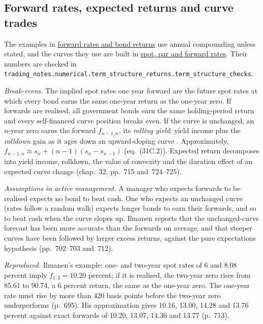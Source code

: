 \subsection{Forward rates, expected returns and curve trades}

The examples in \hyperref[meth:forward-rates-expected-returns]{forward rates and bond returns} use annual compounding unless stated, and the curves they use are built in \hyperref[meth:spot-par-forward-curves]{spot, par and forward rates}. Their numbers are checked in \nolinkurl{trading_notes.numerical.term_structure_returns.term_structure_checks}.

\begin{qfmethod}\label{meth:forward-rates-expected-returns}
 \emph{Break-evens.} The implied spot rates one year forward are the future spot rates at which every bond earns the same one-year return as the one-year zero. If forwards are realised, all government bonds earn the same holding-period return and every self-financed curve position breaks even. If the curve is unchanged, an $n$-year zero earns the forward $f_{n-1,n}$, its \emph{rolling yield}: yield income plus the \emph{rolldown} gain as it ages down an upward-sloping curve \citep[chap.~31, pp.~695 and~711--712]{s7-fabozzifixed}. Approximately, $f_{n-1,n}\approx s_n+(n-1)(s_n-s_{n-1})$ (eq.~(31C.2)). Expected return decomposes into yield income, rolldown, the value of convexity and the duration effect of an expected curve change (chap.~32, pp.~715 and~724--725).

\emph{Assumptions in active management.} A manager who expects forwards to be realised expects no bond to beat cash. One who expects an unchanged curve (rates follow a random walk) expects longer bonds to earn their forwards, and so to beat cash when the curve slopes up. Ilmanen reports that the unchanged-curve forecast has been more accurate than the forwards on average, and that steeper curves have been followed by larger excess returns, against the pure expectations hypothesis (pp.~702--703 and~712).

 \emph{Reproduced.} Ilmanen's example: one- and two-year spot rates of 6 and 8.08 percent imply $f_{1,2}=10.20$ percent; if it is realised, the two-year zero rises from 85.61 to 90.74, a 6 percent return, the same as the one-year zero. The one-year rate must rise by more than 420 basis points before the two-year zero underperforms (p.~695). His approximation gives 10.16, 13.00, 14.28 and 13.76 percent against exact forwards of 10.20, 13.07, 14.36 and 13.77 (p.~713).


\end{qfmethod}
